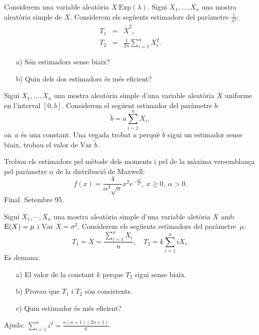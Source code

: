 \newpage

\begin{prob}
{
Considerem una variable aleat\`oria $X\ \mbox{Exp}(\lambda)$. 
Sigui \mbox{$X_1,\ldots,X_n$} una mostra aleat\`oria
simple de $X$. Considerem els seg\"uents estimadors del par\`ametre 
$\frac{1}{\lambda^2}$:
\begin{eqnarray*}
T_1 & = & \overline{X}^2,\\
T_2 & = & \frac{1}{2n}\sum\limits_{i=1}^n X_i^2.
\end{eqnarray*}
\begin{itemize}
\item[a)] S\'on estimadors sense biaix?
\item[b)] Quin dels dos estimadors \'es m\'es eficient?
\end{itemize}

}
\end{prob}

\begin{prob}
{
Sigui $X_1,\ldots,X_n$ una mostra aleat\`oria simple d'una variable
aleat\`oria $X$ uniforme en l'interval $[0,b]$. Considerem
el seg\"uent estimador del par\`ametre $b$:
\[
\tilde{b}=a\sum\limits_{i=1}^n X_i,
\]
on~$a$ \'es una constant.
Una vegada trobat $a$ perqu\`e $\tilde{b}$ sigui un estimador sense biaix,
trobau el valor de $\mbox{Var }\tilde{b}$.
}
\end{prob}

\begin{prob}
{
Trobau els estimadors pel m\`etode dels moments i pel de la m\`axima 
versemblan\c{c}a pel par\`ametre $\alpha$ de la distribuci\'o de Maxwell:
\[
f(x)=\frac{4}{\alpha^3 \sqrt{\pi}} x^2 
e^{-\frac{x^2}{\alpha^2}},\ x\geq 0,\ \alpha >0.
\]
{\footnotesize Final. Setembre 95.}
}
\end{prob}

\begin{prob}
{
Sigui $X_1,\cdots,X_n$ una mostra aleat\`oria simple d'una
variable alet\`oria $X$ amb ${\rm E} (X)=\mu$ i $\mbox{Var } X=\sigma^2$.
Considerem els seg\"uents estimadors del par\`ametre~$\mu$:
\[
T_1 = \overline{X}=\frac{\sum\limits_{i=1}^n X_i}{n},\quad
T_2 = k \sum_{i=1}^n i X_i.
\]
Es demana:
\begin{itemize}
\item[a)] El valor de la constant $k$ perque $T_2$ sigui sense biaix.
\item[b)] Provau que $T_1$ i $T_2$ s\'on consistents.
\item[c)] Quin estimador \'es m\'es eficient?
\end{itemize}
Ajuda: $\sum\limits_{i=1}^n i^2 = \frac{n (n+1) (2n+1)}{6}$.
}
\end{prob}

